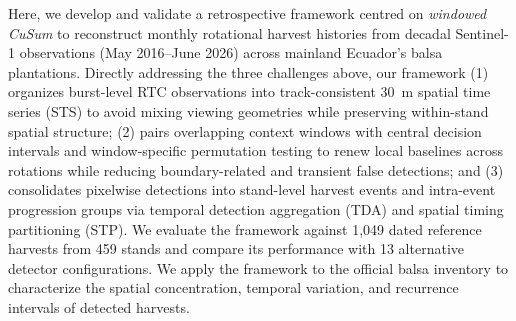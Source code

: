 Here, we develop and validate a retrospective framework centred on \textit{windowed CuSum} to reconstruct monthly rotational harvest histories from decadal Sentinel-1 observations (May 2016--June 2026) across mainland Ecuador's balsa plantations. Directly addressing the three challenges above, our framework (1) organizes burst-level RTC observations into track-consistent 30~m spatial time series (STS) to avoid mixing viewing geometries while preserving within-stand spatial structure; (2) pairs overlapping context windows with central decision intervals and window-specific permutation testing to renew local baselines across rotations while reducing boundary-related and transient false detections; and (3) consolidates pixelwise detections into stand-level harvest events and intra-event progression groups via temporal detection aggregation (TDA) and spatial timing partitioning (STP). We evaluate the framework against 1,049 dated reference harvests from 459 stands and compare its performance with 13 alternative detector configurations. We apply the framework to the official balsa inventory to characterize the spatial concentration, temporal variation, and recurrence intervals of detected harvests.
